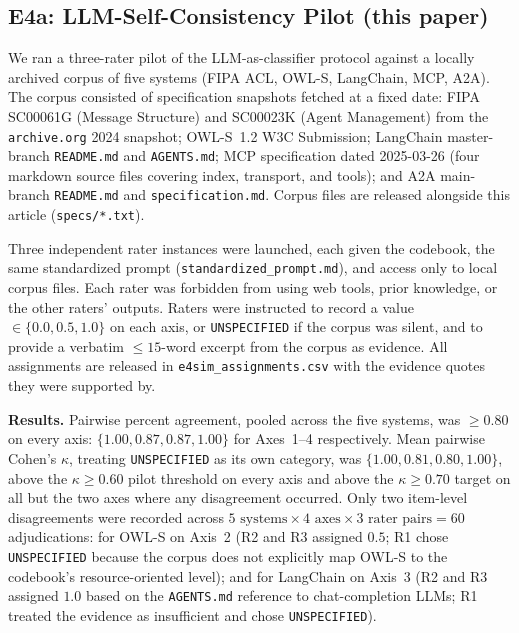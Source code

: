 \documentclass[10pt,twocolumn]{article}
\begin{document}
\subsection{E4a: LLM-Self-Consistency Pilot (this paper)}\label{sec:e4a}

We ran a three-rater pilot of the LLM-as-classifier protocol against a locally archived corpus of five systems (FIPA ACL, OWL-S, LangChain, MCP, A2A).  The corpus consisted of specification snapshots fetched at a fixed date: FIPA SC00061G (Message Structure) and SC00023K (Agent Management) from the \texttt{archive.org} 2024 snapshot; OWL-S~1.2 W3C Submission; LangChain master-branch \texttt{README.md} and \texttt{AGENTS.md}; MCP specification dated 2025-03-26 (four markdown source files covering index, transport, and tools); and A2A main-branch \texttt{README.md} and \texttt{specification.md}.  Corpus files are released alongside this article (\texttt{specs/*.txt}).

Three independent rater instances were launched, each given the codebook, the same standardized prompt (\texttt{standardized\_prompt.md}), and access only to local corpus files.  Each rater was forbidden from using web tools, prior knowledge, or the other raters' outputs.  Raters were instructed to record a value $\in \{0.0, 0.5, 1.0\}$ on each axis, or \texttt{UNSPECIFIED} if the corpus was silent, and to provide a verbatim $\leq 15$-word excerpt from the corpus as evidence.  All assignments are released in \texttt{e4sim\_assignments.csv} with the evidence quotes they were supported by.

\textbf{Results.}  Pairwise percent agreement, pooled across the five systems, was $\geq 0.80$ on every axis: $\{1.00, 0.87, 0.87, 1.00\}$ for Axes~1--4 respectively.  Mean pairwise Cohen's $\kappa$, treating \texttt{UNSPECIFIED} as its own category, was $\{1.00, 0.81, 0.80, 1.00\}$, above the $\kappa \geq 0.60$ pilot threshold on every axis and above the $\kappa \geq 0.70$ target on all but the two axes where any disagreement occurred.  Only two item-level disagreements were recorded across $5\text{ systems}\times 4\text{ axes}\times 3\text{ rater pairs} = 60$ adjudications: for OWL-S on Axis~2 (R2 and R3 assigned $0.5$; R1 chose \texttt{UNSPECIFIED} because the corpus does not explicitly map OWL-S to the codebook's resource-oriented level); and for LangChain on Axis~3 (R2 and R3 assigned $1.0$ based on the \texttt{AGENTS.md} reference to chat-completion LLMs; R1 treated the evidence as insufficient and chose \texttt{UNSPECIFIED}).
\end{document}
